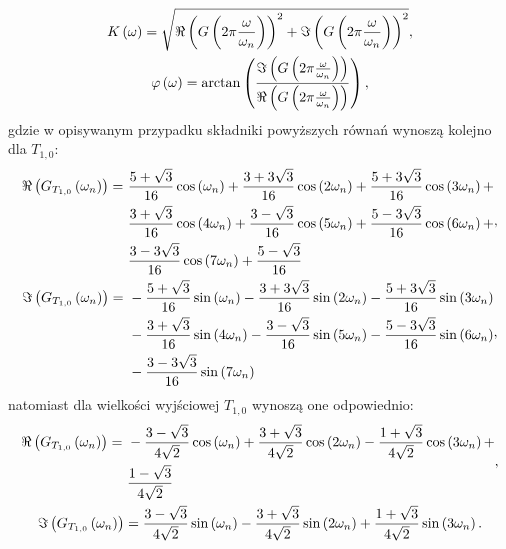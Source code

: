 \begin{gather}
K \left(\omega\right) = \sqrt{\Re \left( G \left( 2\pi \frac{\omega}{\omega_{n}} \right) \right)^{2} + \Im \left( G \left( 2\pi \frac{\omega}{\omega_{n}} \right) \right)^{2}} \label{eq:sym_partd_output_amp_w}, \\
\varphi \left(\omega\right) = \arctan \left( \frac{\Im \left( G \left( 2\pi \frac{\omega}{\omega_{n}} \right) \right)}{\Re \left( G \left( 2\pi \frac{\omega}{\omega_{n}} \right) \right)} \right) \label{eq:sym_partd_output_phi_w},
\end{gather}
gdzie w opisywanym przypadku składniki powyższych równań wynoszą kolejno dla $T_{1,0}$:
\begin{gather}
\begin{split}
\Re \left( G_{T_{1,0}} \left(\omega_{n}\right) \right) = ~
& \frac{5 + \sqrt{3}}{16} \cos \left(\omega_{n}\right) + \frac{3 + 3 \sqrt{3}}{16} \cos \left(2\omega_{n}\right) + \frac{5 + 3 \sqrt{3}}{16} \cos \left(3\omega_{n}\right) + \\
& \frac{3 + \sqrt{3}}{16} \cos \left(4\omega_{n}\right) + \frac{3 - \sqrt{3}}{16} \cos \left(5\omega_{n}\right) + \frac{5 - 3 \sqrt{3}}{16} \cos \left(6\omega_{n}\right) + \\
& \frac{3 - 3 \sqrt{3}}{16} \cos \left(7\omega_{n}\right) + \frac{5 - \sqrt{3}}{16}
\end{split}
\label{eq:sym_partd_output_trans_wn_re_S_2_0}, \\
\begin{split}
\Im \left( G_{T_{1,0}} \left(\omega_{n}\right) \right) = ~
& - \frac{5 + \sqrt{3}}{16} \sin \left(\omega_{n}\right) - \frac{3 + 3 \sqrt{3}}{16} \sin \left(2\omega_{n}\right) - \frac{5 + 3 \sqrt{3}}{16} \sin \left(3\omega_{n}\right) \\
& - \frac{3 + \sqrt{3}}{16} \sin \left(4\omega_{n}\right) - \frac{3 - \sqrt{3}}{16} \sin \left(5\omega_{n}\right) - \frac{5 - 3 \sqrt{3}}{16} \sin \left(6\omega_{n}\right) \\
& - \frac{3 - 3 \sqrt{3}}{16} \sin \left(7\omega_{n}\right)
\end{split}
\label{eq:sym_partd_output_trans_wn_im_S_2_0},
\end{gather}
natomiast dla wielkości wyjściowej $T_{1,0}$ wynoszą one odpowiednio:
\begin{gather}
\begin{split}
\Re \left( G_{T_{1,0}} \left(\omega_{n}\right) \right) = ~
& - \frac{3 - \sqrt{3}}{4 \sqrt{2}} \cos \left(\omega_{n}\right) + \frac{3 + \sqrt{3}}{4 \sqrt{2}} \cos \left(2\omega_{n}\right) - \frac{1 + \sqrt{3}}{4 \sqrt{2}} \cos \left(3\omega_{n}\right) + \\
& \frac{1 - \sqrt{3}}{4 \sqrt{2}}
\end{split}
\label{eq:sym_partd_output_trans_wn_re_T_1_0}, \\
\Im \left( G_{T_{1,0}} \left(\omega_{n}\right) \right) = \frac{3 - \sqrt{3}}{4 \sqrt{2}} \sin \left(\omega_{n}\right) - \frac{3 + \sqrt{3}}{4 \sqrt{2}} \sin \left(2\omega_{n}\right) + \frac{1 + \sqrt{3}}{4 \sqrt{2}} \sin \left(3\omega_{n}\right)
\label{eq:sym_partd_output_trans_wn_im_T_1_0}.
\end{gather}


